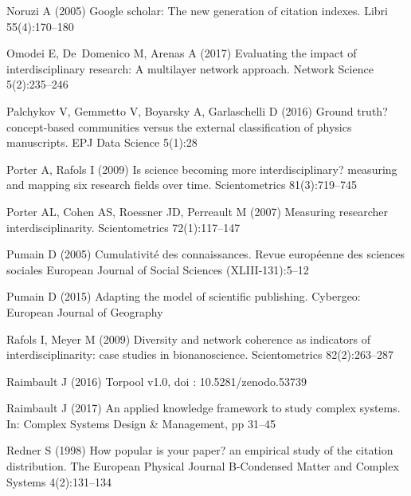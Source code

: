 \begin{thebibliography}{84}
Noruzi A (2005) Google scholar: The new generation of citation indexes. Libri
  55(4):170--180

Omodei E, De~Domenico M, Arenas A (2017) Evaluating the impact of
  interdisciplinary research: A multilayer network approach. Network Science
  5(2):235--246

Palchykov V, Gemmetto V, Boyarsky A, Garlaschelli D (2016) Ground truth?
  concept-based communities versus the external classification of physics
  manuscripts. EPJ Data Science 5(1):28

Porter A, Rafols I (2009) Is science becoming more interdisciplinary? measuring
  and mapping six research fields over time. Scientometrics 81(3):719--745

Porter AL, Cohen AS, Roessner JD, Perreault M (2007) Measuring researcher
  interdisciplinarity. Scientometrics 72(1):117--147

Pumain D (2005) Cumulativit{\'e} des connaissances. Revue europ{\'e}enne des
  sciences sociales European Journal of Social Sciences (XLIII-131):5--12

Pumain D (2015) Adapting the model of scientific publishing. Cybergeo: European
  Journal of Geography

Rafols I, Meyer M (2009) Diversity and network coherence as indicators of
  interdisciplinarity: case studies in bionanoscience. Scientometrics
  82(2):263--287

Raimbault J (2016) Torpool v1.0, doi : 10.5281/zenodo.53739

Raimbault J (2017) An applied knowledge framework to study complex systems. In:
  Complex Systems Design \& Management, pp 31--45

Redner S (1998) How popular is your paper? an empirical study of the citation
  distribution. The European Physical Journal B-Condensed Matter and Complex
  Systems 4(2):131--134


\end{thebibliography}
